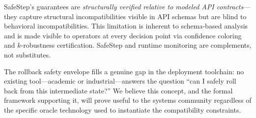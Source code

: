 \documentclass[10pt,twocolumn]{article}
\begin{document}
SafeStep's guarantees are \emph{structurally verified relative to modeled API contracts}---they capture structural incompatibilities visible in API schemas but are blind to behavioral incompatibilities. This limitation is inherent to schema-based analysis and is made visible to operators at every decision point via confidence coloring and $k$-robustness certification. SafeStep and runtime monitoring are complements, not substitutes.

The rollback safety envelope fills a genuine gap in the deployment toolchain: no existing tool---academic or industrial---answers the question ``can I safely roll back from this intermediate state?'' We believe this concept, and the formal framework supporting it, will prove useful to the systems community regardless of the specific oracle technology used to instantiate the compatibility constraints.

\end{document}
